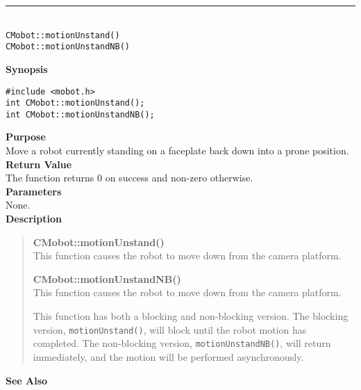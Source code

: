 \noindent
\vspace{5pt}
\rule{4.5in}{0.015in}\\
\noindent
{\LARGE \texttt{CMobot::motionUnstand()}}\\
{\LARGE \texttt{CMobot::motionUnstandNB()}}\\
{}

\noindent
{\bf Synopsis}
\vspace{-8pt}
\begin{verbatim}
#include <mobot.h>
int CMobot::motionUnstand();
int CMobot::motionUnstandNB();
\end{verbatim}

\noindent
{\bf Purpose}\\
Move a robot currently standing on a faceplate back down into a prone position.\\

\noindent
{\bf Return Value}\\
The function returns 0 on success and non-zero otherwise.\\

\noindent
{\bf Parameters}\\
None.\\

\noindent
{\bf Description}\\
\vspace{-12pt}
\begin{quote}
{\bf CMobot::motionUnstand()}\\
This function causes the robot to move down from the camera platform.

{\bf CMobot::motionUnstandNB()}\\
This function causes the robot to move down from the camera platform.

This function has both a blocking and non-blocking version.
The blocking version, \texttt{motionUnstand()}, will block until the
robot motion has completed. The non-blocking version, \texttt{motionUnstandNB()},
will return immediately, and the motion will be performed asynchronously.\\
\end{quote}

\noindent
{\bf See Also}\\

